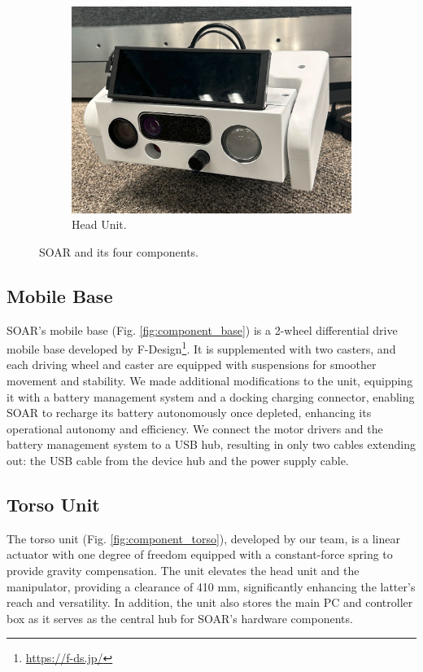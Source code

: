 \documentclass[runningheads,a4paper]{llncs}
\begin{document}
\begin{figure}[tbp]
\begin{minipage}[b]{0.25\linewidth}
\begin{subfigure}[b]{\linewidth}
			\includegraphics[width=\linewidth]{images/component_head.png}
			\caption{Head Unit.}
			\label{fig:component_head}
		\end{subfigure}
	\end{minipage}
	\caption{SOAR and its four components.}
	\label{fig:components}
\end{figure}

\subsection{Mobile Base}
SOAR’s mobile base (Fig. \ref{fig:component_base}) is a 2-wheel differential drive mobile base developed by F-Design\footnote{\url{https://f-ds.jp/}}.
It is supplemented with two casters, and each driving wheel and caster are equipped with suspensions for smoother movement and stability.
We made additional modifications to the unit, equipping it with a battery management system and a docking charging connector, enabling SOAR to recharge its battery autonomously once depleted, enhancing its operational autonomy and efficiency.
We connect the motor drivers and the battery management system to a USB hub, resulting in only two cables extending out: the USB cable from the device hub and the power supply cable.

\subsection{Torso Unit}
The torso unit (Fig. \ref{fig:component_torso}), developed by our team, is a linear actuator with one degree of freedom equipped with a constant-force spring to provide gravity compensation.
The unit elevates the head unit and the manipulator, providing a clearance of 410 mm, significantly enhancing the latter's reach and versatility.
In addition, the unit also stores the main PC and controller box as it serves as the central hub for SOAR's hardware components.
\end{document}
